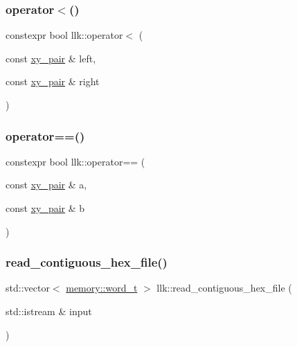 \mbox{\label{namespacellk_a23565b6066cff81531570244007bdbd3}} 
\subsubsection{\texorpdfstring{operator$<$()}{operator<()}}
{\footnotesize\ttfamily constexpr bool llk\+::operator$<$ (\begin{DoxyParamCaption}\item[{const \hyperlink{structllk_1_1xy__pair}{xy\+\_\+pair} \&}]{left,  }\item[{const \hyperlink{structllk_1_1xy__pair}{xy\+\_\+pair} \&}]{right }\end{DoxyParamCaption})\hspace{0.3cm}{\ttfamily [inline]}}

\mbox{\label{namespacellk_af1f5667d80a5b9802c82d0b618ae6c84}} 
\subsubsection{\texorpdfstring{operator==()}{operator==()}}
{\footnotesize\ttfamily constexpr bool llk\+::operator== (\begin{DoxyParamCaption}\item[{const \hyperlink{structllk_1_1xy__pair}{xy\+\_\+pair} \&}]{a,  }\item[{const \hyperlink{structllk_1_1xy__pair}{xy\+\_\+pair} \&}]{b }\end{DoxyParamCaption})\hspace{0.3cm}{\ttfamily [inline]}}

\mbox{\label{namespacellk_abab62bc3369d43352be7b3f6b24a2717}} 
\subsubsection{\texorpdfstring{read\+\_\+contiguous\+\_\+hex\+\_\+file()}{read\_contiguous\_hex\_file()}\hspace{0.1cm}{\footnotesize\ttfamily [1/2]}}
{\footnotesize\ttfamily std\+::vector$<$ \hyperlink{classllk_1_1memory_a432a6c0ae1bcb9c44d79cfa1a239419c}{memory\+::word\+\_\+t} $>$ llk\+::read\+\_\+contiguous\+\_\+hex\+\_\+file (\begin{DoxyParamCaption}\item[{std\+::istream \&}]{input }\end{DoxyParamCaption})}

